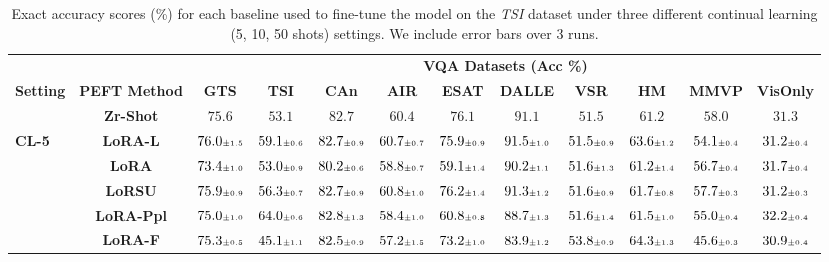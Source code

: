 \begin{table}
\caption{Exact accuracy scores (\%) for each baseline used to fine-tune the model on the \emph{TSI} dataset under three different continual learning (5, 10, 50 shots)  settings. We include error bars over 3 runs.}
 \label{table:fine_tune_llm_tsi}
\vskip 0.15in
\begin{center}
\begin{small}
\begingroup
\setlength{\tabcolsep}{3.6pt}
\begin{tabular}{l c c c c c c c c c c c}
\toprule
 & & \multicolumn{10}{c}{\textbf{VQA Datasets (Acc \%)}}  \\
\cmidrule(lr){3-12}
\textbf{Setting} & \textbf{PEFT Method}  & \textbf{GTS} & \textbf{TSI} & \textbf{CAn} & \textbf{AIR} & \textbf{ESAT} & \textbf{DALLE} & \textbf{VSR} & \textbf{HM} & \textbf{MMVP} & \textbf{VisOnly} \\
\midrule
 & \textbf{Zr-Shot} & $75.6$ & $53.1$ & $82.7$ & $60.4$ & $76.1$ & $91.1$ & $51.5$ & $61.2$ & $58.0$ & $31.3$ \\
\midrule
\multirow{6}{*}{\textbf{CL-5}} & \textbf{LoRA-L} & $76.0 \mbox{\tiny\ensuremath{\pm 1.5}}$ & $59.1 \mbox{\tiny\ensuremath{\pm 0.6}}$ & $82.7 \mbox{\tiny\ensuremath{\pm 0.9}}$ & $60.7 \mbox{\tiny\ensuremath{\pm 0.7}}$ & $75.9 \mbox{\tiny\ensuremath{\pm 0.9}}$ & $91.5 \mbox{\tiny\ensuremath{\pm 1.0}}$ & $51.5 \mbox{\tiny\ensuremath{\pm 0.9}}$ & $63.6 \mbox{\tiny\ensuremath{\pm 1.2}}$ & $54.1 \mbox{\tiny\ensuremath{\pm 0.4}}$ & $31.2 \mbox{\tiny\ensuremath{\pm 0.4}}$ \\
& \textbf{LoRA} & $73.4 \mbox{\tiny\ensuremath{\pm 1.0}}$ & $53.0 \mbox{\tiny\ensuremath{\pm 0.9}}$ & $80.2 \mbox{\tiny\ensuremath{\pm 0.6}}$ & $58.8 \mbox{\tiny\ensuremath{\pm 0.7}}$ & $59.1 \mbox{\tiny\ensuremath{\pm 1.4}}$ & $90.2 \mbox{\tiny\ensuremath{\pm 1.1}}$ & $51.6 \mbox{\tiny\ensuremath{\pm 1.3}}$ & $61.2 \mbox{\tiny\ensuremath{\pm 1.4}}$ & $56.7 \mbox{\tiny\ensuremath{\pm 0.4}}$ & $31.7 \mbox{\tiny\ensuremath{\pm 0.4}}$ \\
& \textbf{LoRSU} & $75.9 \mbox{\tiny\ensuremath{\pm 0.9}}$ & $56.3 \mbox{\tiny\ensuremath{\pm 0.7}}$ & $82.7 \mbox{\tiny\ensuremath{\pm 0.9}}$ & $60.8 \mbox{\tiny\ensuremath{\pm 1.0}}$ & $76.2 \mbox{\tiny\ensuremath{\pm 1.4}}$ & $91.3 \mbox{\tiny\ensuremath{\pm 1.2}}$ & $51.6 \mbox{\tiny\ensuremath{\pm 0.9}}$ & $61.7 \mbox{\tiny\ensuremath{\pm 0.8}}$ & $57.7 \mbox{\tiny\ensuremath{\pm 0.3}}$ & $31.2 \mbox{\tiny\ensuremath{\pm 0.3}}$ \\
& \textbf{LoRA-Ppl} & $75.0 \mbox{\tiny\ensuremath{\pm 1.0}}$ & $64.0 \mbox{\tiny\ensuremath{\pm 0.6}}$ & $82.8 \mbox{\tiny\ensuremath{\pm 1.3}}$ & $58.4 \mbox{\tiny\ensuremath{\pm 1.0}}$ & $60.8 \mbox{\tiny\ensuremath{\pm 0.8}}$ & $88.7 \mbox{\tiny\ensuremath{\pm 1.3}}$ & $51.6 \mbox{\tiny\ensuremath{\pm 1.4}}$ & $61.5 \mbox{\tiny\ensuremath{\pm 1.0}}$ & $55.0 \mbox{\tiny\ensuremath{\pm 0.4}}$ & $32.2 \mbox{\tiny\ensuremath{\pm 0.4}}$ \\
& \textbf{LoRA-F} & $75.3 \mbox{\tiny\ensuremath{\pm 0.5}}$ & $45.1 \mbox{\tiny\ensuremath{\pm 1.1}}$ & $82.5 \mbox{\tiny\ensuremath{\pm 0.9}}$ & $57.2 \mbox{\tiny\ensuremath{\pm 1.5}}$ & $73.2 \mbox{\tiny\ensuremath{\pm 1.0}}$ & $83.9 \mbox{\tiny\ensuremath{\pm 1.2}}$ & $53.8 \mbox{\tiny\ensuremath{\pm 0.9}}$ & $64.3 \mbox{\tiny\ensuremath{\pm 1.3}}$ & $45.6 \mbox{\tiny\ensuremath{\pm 0.3}}$ & $30.9 \mbox{\tiny\ensuremath{\pm 0.4}}$ \\

\end{tabular}
\end{small}
\end{center}
\end{table}
